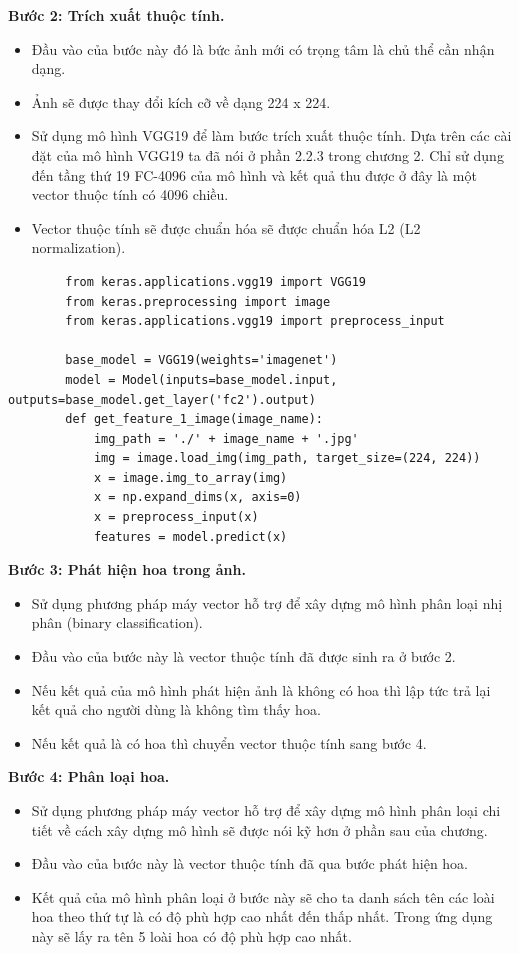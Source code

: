 \documentclass[12pt]{report}
\begin{document}
		\textbf{Bước 2: Trích xuất thuộc tính.} 
		\begin{itemize}
			\item Đầu vào của bước này đó là bức ảnh mới có trọng tâm là chủ thể cần nhận dạng.
			\item Ảnh sẽ được thay đổi kích cỡ về dạng 224 x 224.
			\item Sử dụng mô hình VGG19 \cite{cia_vgg19} để làm bước trích xuất thuộc tính. Dựa trên các cài đặt của mô hình VGG19 \cite{cia_vgg19} ta đã nói ở phần 2.2.3 trong chương 2. Chỉ sử dụng đến tầng thứ 19 FC-4096 của mô hình và kết quả thu được ở đây là một vector thuộc tính có 4096 chiều.
			\item Vector thuộc tính sẽ được chuẩn hóa sẽ được chuẩn hóa L2 (L2 normalization).
		\end{itemize}
														
														
		\begin{lstlisting}
		from keras.applications.vgg19 import VGG19
		from keras.preprocessing import image
		from keras.applications.vgg19 import preprocess_input

		base_model = VGG19(weights='imagenet')
		model = Model(inputs=base_model.input,   outputs=base_model.get_layer('fc2').output)
		def get_feature_1_image(image_name):
			img_path = './' + image_name + '.jpg'
			img = image.load_img(img_path, target_size=(224, 224))
			x = image.img_to_array(img)
			x = np.expand_dims(x, axis=0)
			x = preprocess_input(x)
			features = model.predict(x)
		\end{lstlisting}
												
		\textbf{Bước 3: Phát hiện hoa trong ảnh.} 
		\begin{itemize}
			\item Sử dụng phương pháp máy vector hỗ trợ để xây dựng mô hình phân loại nhị phân (binary classification).
			\item Đầu vào của bước này là vector thuộc tính đã được sinh ra ở bước 2.
			\item Nếu kết quả của mô hình phát hiện ảnh là không có hoa thì lập tức trả lại kết quả cho người dùng là không tìm thấy hoa.
			\item Nếu kết quả là có hoa thì chuyển vector thuộc tính sang bước 4.
		\end{itemize}
														
														
		\textbf{Bước 4: Phân loại hoa.} 
		\begin{itemize}
			\item Sử dụng phương pháp máy vector hỗ trợ để xây dựng mô hình phân loại chi tiết về cách xây dựng mô hình sẽ được nói kỹ hơn ở phần sau của chương.
			\item Đầu vào của bước này là vector thuộc tính đã qua bước phát hiện hoa.
			\item Kết quả của mô hình phân loại ở bước này sẽ cho ta danh sách tên các loài hoa theo thứ tự là có độ phù hợp cao nhất đến thấp nhất. Trong ứng dụng này sẽ lấy ra tên 5 loài hoa có độ phù hợp cao nhất.
		\end{itemize}
														
\end{document}

